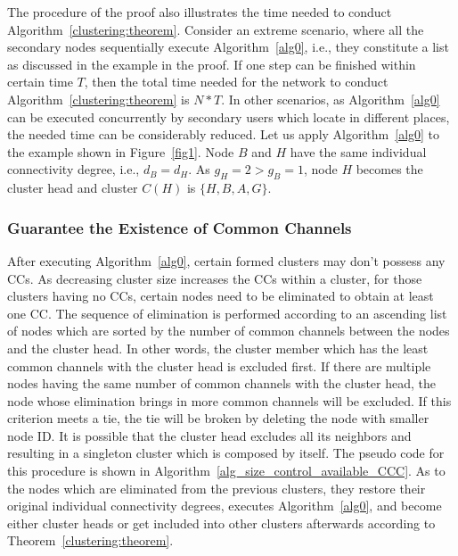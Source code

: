 \documentclass[10pt,journal,compsoc]{IEEEtran}
\theoremstyle{mytheoremstyle}
\theoremstyle{mytheoremstyle}
\theoremstyle{mytheoremstyle}
\newcommand{\ie}{i.e., }
\begin{document}
The procedure of the proof also illustrates the time needed to conduct Algorithm~\ref{clustering:theorem}. 
Consider an extreme scenario, where all the secondary nodes sequentially execute Algorithm~\ref{alg0}, \ie they constitute a list as discussed in the example in the proof.
%
If one step can be finished within certain time $T$, then the total time needed for the network to conduct Algorithm~\ref{clustering:theorem} is $N*T$.
In other scenarios, as Algorithm~\ref{alg0} can be executed concurrently by secondary users which locate in different places, the needed time can be considerably reduced.
%
Let us apply Algorithm~\ref{alg0} to the example shown in Figure~\ref{fig1}.
Node $B$ and $H$ have the same individual connectivity degree, i.e., $d_B=d_H$. As $g_H=2>g_B=1$, node $H$ becomes the cluster head and cluster $C(H)$ is $\{H, B, A, G\}$.
	




\subsubsection{Guarantee the Existence of Common Channels}
\label{ross_p1_guarantee_ccc}
After executing Algorithm~\ref{alg0}, certain formed clusters may don't possess any CCs.
As decreasing cluster size increases the CCs within a cluster, for those clusters having no CCs, certain nodes need to be eliminated to obtain at least one CC.
The sequence of elimination is performed according to an ascending list of nodes which are sorted by the number of common channels between the nodes and the cluster head. 
In other words, the cluster member which has the least common channels with the cluster head is excluded first.
If there are multiple nodes having the same number of common channels with the cluster head, the node whose elimination brings in more common channels will be excluded.
If this criterion meets a tie, the tie will be broken by deleting the node with smaller node ID.
It is possible that the cluster head excludes all its neighbors and resulting in a singleton cluster which is composed by itself.
The pseudo code for this procedure is shown in Algorithm~\ref{alg_size_control_available_CCC}.
As to the nodes which are eliminated from the previous clusters, they restore their original individual connectivity degrees, executes Algorithm~\ref{alg0}, and become either cluster heads or get included into other clusters afterwards according to Theorem~\ref{clustering:theorem}.
\end{document}

